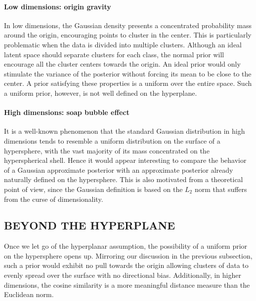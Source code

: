 \documentclass[letterpaper]{article}
\begin{document}
\paragraph{Low dimensions: origin gravity} \label{par:lowdim}
In low dimensions, the Gaussian density presents a concentrated probability mass around the origin, encouraging points to cluster in the center. This is particularly problematic when the data is divided into multiple clusters. Although an ideal latent space should separate clusters for each class, the normal prior will encourage all the cluster centers towards the origin. An ideal prior would only stimulate the variance of the posterior without forcing its mean to be close to the center. A prior satisfying these properties is a uniform over the entire space. Such a uniform prior, however, is not well defined on the hyperplane.
 
\paragraph{High dimensions: soap bubble effect} \label{par:highdim}
It is a well-known phenomenon that the standard Gaussian distribution in high dimensions tends to resemble a uniform distribution on the surface of a hypersphere, with the vast majority of its mass concentrated on the hyperspherical shell. Hence it would appear interesting to compare the behavior of a Gaussian approximate posterior with an approximate posterior already naturally defined on the hypersphere. This is also motivated from a theoretical point of view, since the Gaussian definition is based on the $L_2$ norm that suffers from the curse of dimensionality.

\subsection{BEYOND THE HYPERPLANE} \label{subsec:beyond-hyperplanes}
Once we let go of the hyperplanar assumption, the possibility of a uniform prior on the hypersphere opens up. Mirroring our discussion in the previous subsection, such a prior would exhibit no pull towards the origin allowing clusters of data to evenly spread over the surface with no directional bias. Additionally, in higher dimensions, the cosine similarity is a more meaningful distance measure than the Euclidean norm.
 
\end{document}

